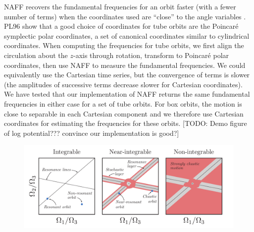 \documentclass[letterpaper,12pt,preprint]{aastex}
\begin{document}
NAFF recovers the fundamental frequencies for an orbit faster (with a fewer number of terms) when the coordinates used are ``close'' to the angle variables \cite[PL96;][]{papaphilippou96}. PL96 show that a good choice of coordinates for tube orbits are the Poincar\'e symplectic polar coordinates, a set of canonical coordinates similar to cylindrical coordinates. When computing the frequencies for tube orbits, we first align the circulation about the $z$-axis through rotation, transform to Poincar\'e polar coordinates, then use NAFF to measure the fundamental frequencies. We could equivalently use the Cartesian time series, but the convergence of terms is slower (the amplitudes of successive terms decrease slower for Cartesian coordinates). We have tested that our implementation of NAFF returns the same fundamental frequencies in either case for a set of tube orbits. For box orbits, the motion is close to separable in each Cartesian component and we therefore use Cartesian coordinates for estimating the frequencies for these orbits. [TODO: Demo figure of log potential??? convince our implementation is good?]

\begin{figure}
\begin{center}
\includegraphics[width=\textwidth]{figures/cartoons.pdf}
\caption{} 
\label{fig:cartoons}
\end{center}
\end{figure}
\end{document}
